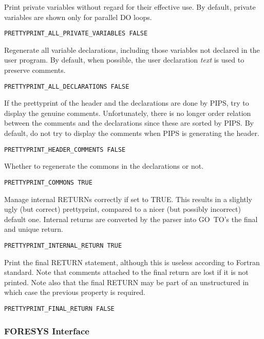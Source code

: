 Print private variables without regard for their effective use. By
default, private variables are shown only for parallel DO loops.

\begin{verbatim}
PRETTYPRINT_ALL_PRIVATE_VARIABLES FALSE
\end{verbatim}


Regenerate all variable declarations, including those variables not
declared in the user program. By default, when possible, the user
declaration {\em text} is used to preserve comments.

\begin{verbatim}
PRETTYPRINT_ALL_DECLARATIONS FALSE
\end{verbatim}

If the prettyprint of the header and the declarations are done by
PIPS, try to display the genuine comments. Unfortunately, there is no
longer order relation between the comments and the declarations since
these are sorted by PIPS. By default, do not try to display the
comments when PIPS is generating the header.
\begin{verbatim}
PRETTYPRINT_HEADER_COMMENTS FALSE
\end{verbatim}

Whether to regenerate the commons in the declarations or not.

\begin{verbatim}
PRETTYPRINT_COMMONS TRUE
\end{verbatim}

Manage internal RETURNs correctly if set to TRUE.  This results in a
slightly ugly (but correct) prettyprint, compared to a nicer (but
possibly incorrect) default one. Internal returns are converted by the
parser into GO~TO's the final and unique return.

\begin{verbatim}
PRETTYPRINT_INTERNAL_RETURN TRUE
\end{verbatim}

Print the final RETURN statement, although this is useless according to
Fortran standard. Note that comments attached to the final return are
lost if it is not printed. Note also that the final RETURN may be part
of an unstructured in which case the previous property is required.

\begin{verbatim}
PRETTYPRINT_FINAL_RETURN FALSE
\end{verbatim}

\subsubsection{FORESYS Interface}

